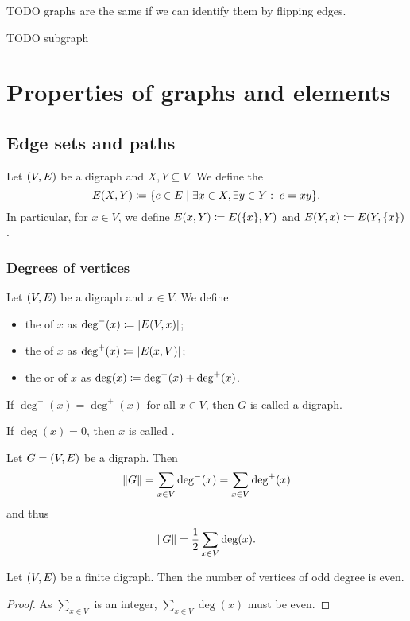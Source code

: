 TODO graphs are the same if we can identify them by flipping edges.

TODO subgraph

\section{Properties of graphs and elements}
\subsection{Edge sets and paths}
\begin{definition}
Let $\left( V,E \right)$ be a digraph and $X,Y\subseteq V$. We define the 
\[ E(X,Y) \defeq \setbuilder{e\in E}{\exists x\in X, \exists y\in Y: \; e = xy}. \]
In particular, for $x\in V$, we define $E(x, Y) \coloneqq E(\{x\}, Y)$ and $E(Y, x) \coloneqq E(Y,\{x\})$.
\end{definition}

\subsubsection{Degrees of vertices}
\begin{definition}
Let $\left( V,E \right)$ be a digraph and $x\in V$. We define
\begin{itemize}
\item the  of $x$ as $\deg^-(x) \coloneqq |E(V,x)|$;
\item the  of $x$ as $\deg^+(x) \coloneqq |E(x, V)|$;
\item the  or  of $x$ as $\deg(x) \coloneqq \deg^-(x) + \deg^+(x)$.
\end{itemize}
If $\deg^-(x) = \deg^+(x)$ for all $x\in V$, then $G$ is called a  digraph.

If $\deg(x) = 0$, then $x$ is called .
\end{definition}

\begin{lemma} \label{degreeSumFormula}
Let $G = \left( V,E \right)$ be a digraph. Then
\[ \lVert G\rVert = \sum_{x\in V}\deg^-(x) = \sum_{x\in V}\deg^+(x) \]
and thus
\[ \lVert G\rVert = \frac{1}{2}\sum_{x\in V}\deg(x). \]
\end{lemma}
\begin{corollary}
Let $\left( V,E \right)$ be a finite digraph. Then the number of vertices of odd degree is even.
\end{corollary}
\begin{proof}
As $\sum_{x\in V}$ is an integer, $\sum_{x\in V}\deg(x)$ must be even.
\end{proof}

